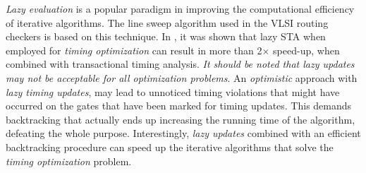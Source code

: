 %
{\em Lazy evaluation} is a popular paradigm in improving the computational efficiency of iterative algorithms.
The line sweep algorithm used in the VLSI routing checkers is based on this technique.
In \cite{papa:10}, it was shown that lazy STA when employed for {\em timing optimization} can result in more
than 2$\times$ speed-up, when combined with transactional timing analysis.
{\em It should be noted that lazy updates may not be acceptable for all optimization problems}. 
An {\em optimistic} approach with {\em lazy timing updates},
may lead to unnoticed timing violations that might have occurred on the gates
that have been marked for timing updates. This demands backtracking that actually ends up
increasing the running time of the algorithm, defeating the whole purpose. 
Interestingly, {\em lazy updates} combined with an efficient backtracking procedure can speed 
up the iterative algorithms that solve the {\em timing optimization} problem.



